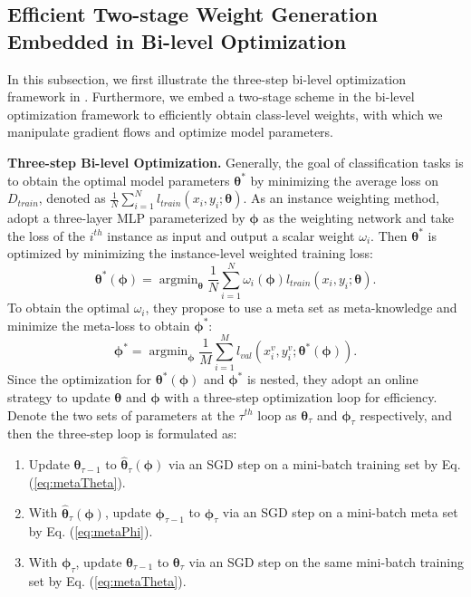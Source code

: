 \subsection{Efficient Two-stage Weight Generation Embedded in Bi-level Optimization}
\label{subsec:effiBilevel}
%

In this subsection, we first illustrate the three-step bi-level optimization framework in \cite{shuMetaWeightNetLearningExplicit2019a}.
%
Furthermore, we embed a two-stage scheme in the bi-level optimization framework to efficiently obtain class-level weights, with which we manipulate gradient flows and optimize model parameters.

%
\textbf{Three-step Bi-level Optimization.} 
%
Generally, the goal of classification tasks is to obtain the optimal model parameters $\boldsymbol \theta^*$ by minimizing the average loss on $D_{train}$, denoted as $\frac{1}{N}\sum_{i=1}^N l_{train}(x_i, y_i;\boldsymbol \theta)$.
%
As an instance weighting method, \cite{shuMetaWeightNetLearningExplicit2019a} adopt a three-layer MLP parameterized by $\boldsymbol \phi$ as the weighting network and take the loss of the $i^{th}$ instance as input and output a scalar weight $\omega_i$.
%
Then $\boldsymbol \theta^*$ is optimized by minimizing the instance-level weighted training loss:
\begin{equation}
    \label{eq:metaTheta}
    \boldsymbol \theta^*(\boldsymbol \phi) = \mathop{\arg\min}_{\boldsymbol \theta} \frac{1}{N}\sum_{i=1}^N\omega_i(\boldsymbol \phi)l_{train}(x_i, y_i;\boldsymbol \theta).
\end{equation}
%
To obtain the optimal $\omega_i$, they propose to use a meta set as meta-knowledge and minimize the meta-loss to obtain $\boldsymbol \phi^*$:
\begin{equation}
    \label{eq:metaPhi}
    \boldsymbol \phi^* = \mathop{\arg\min}_{\boldsymbol \phi}\frac{1}{M}\sum_{i=1}^M l_{val}(x_i^v, y_i^v;\boldsymbol \theta^*(\boldsymbol \phi)).
\end{equation}
%
Since the optimization for $\boldsymbol \theta^*(\boldsymbol \phi)$ and $\boldsymbol \phi^*$ is nested, they adopt an online strategy to update $\boldsymbol \theta$ and $\boldsymbol \phi$ with a three-step optimization loop for efficiency.
%
Denote the two sets of parameters at the $\tau^{th}$ loop as $\boldsymbol \theta _\tau$ and $\boldsymbol \phi _\tau$ respectively, and then the three-step loop is formulated as:
\begin{enumerate}[label=\textbf{Step \arabic*}]
    \item Update $\boldsymbol \theta_{\tau-1}$ to $\hat {\boldsymbol \theta}_\tau(\boldsymbol \phi)$ via an SGD step on a mini-batch training set by Eq. (\ref{eq:metaTheta}).
    \item With $\hat{\boldsymbol \theta}_\tau (\boldsymbol \phi)$, update $\boldsymbol \phi _{\tau-1}$ to $\boldsymbol \phi _\tau$ via an SGD step on a mini-batch meta set by Eq. (\ref{eq:metaPhi}).
    \item With $\boldsymbol \phi _\tau$, update $\boldsymbol \theta_{\tau-1}$ to $\boldsymbol \theta_\tau$ via an SGD step on the same mini-batch training set by Eq. (\ref{eq:metaTheta}).
\end{enumerate}
